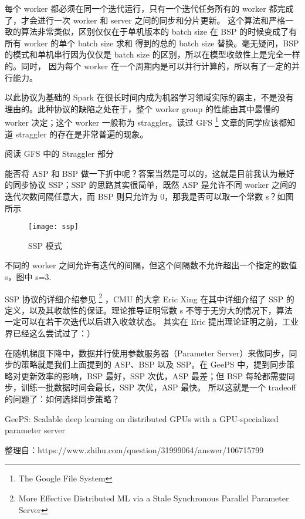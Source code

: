 每个 worker 都必须在同一个迭代运行，只有一个迭代任务所有的 worker 都完成了，才会进行一次 worker 和 server 之间的同步和分片更新。
这个算法和严格一致的算法非常类似，区别仅仅在于单机版本的 batch size 在 BSP 的时候变成了有所有 worker 的单个 batch size 求和
得到的总的 batch size 替换。毫无疑问，BSP 的模式和单机串行因为仅仅是 batch size 的区别，所以在模型收敛性上是完全一样的。同时，
因为每个 worker 在一个周期内是可以并行计算的，所以有了一定的并行能力。

以此协议为基础的 Spark 在很长时间内成为机器学习领域实际的霸主，不是没有理由的。此种协议的缺陷之处在于，整个 worker group 的性能由其中最慢的 worker 决定；这个 worker 一般称为 straggler。读过 GFS%
\footnote{The Google File System}%
文章的同学应该都知道 straggler 的存在是非常普遍的现象。

\begin{newnote}
阅读 GFS 中的 Straggler 部分  %
\end{newnote}

能否将 ASP 和 BSP 做一下折中呢？答案当然是可以的，这就是目前我认为最好的同步协议 SSP；SSP 的思路其实很简单，既然 ASP 是允许不同 worker 之间的
迭代次数间隔任意大，而 BSP 则只允许为 0，那我是否可以取一个常数 s？如图所示

\begin{figure}[hbtp]
\centering
\texttt{[image: ssp]}
\caption{SSP 模式}
\end{figure}

不同的 worker 之间允许有迭代的间隔，但这个间隔数不允许超出一个指定的数值 s，图中 s=3.

SSP 协议的详细介绍参见%
\footnote{More Effective Distributed ML via a Stale Synchronous Parallel Parameter Server}%
，CMU 的大拿 Eric Xing 在其中详细介绍了 SSP 的定义，以及其收敛性的保证。理论推导证明常数 s 不等于无穷大的情况下，算法一定可以在若干次迭代以后进入收敛状态。
其实在 Eric 提出理论证明之前，工业界已经这么尝试过了：）

\begin{newnote}[从另一个角度看数据并行]
在随机梯度下降中，数据并行使用参数服务器（Parameter Server）来做同步，同步的策略就是我们上面提到的 ASP、BSP 以及 SSP。在 GeePS
中，提到同步策略对更新效率的影响，BSP 最好，SSP 次优，ASP 最差；但 BSP 每轮都需要同步，训练一批数据时间会最长，SSP 次优，ASP 最快。
所以这就是一个 tradeoff 的问题了：如何选择同步策略？

GeePS: Scalable deep learning on distributed GPUs with a GPU-specialized parameter server  %

整理自：https://www.zhihu.com/question/31999064/answer/106715799
\end{newnote}


